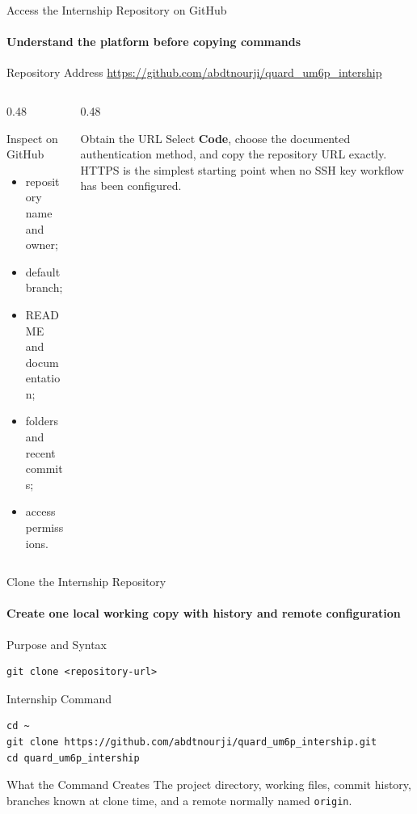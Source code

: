 \begin{frame}{Access the Internship Repository on GitHub}
\framesubtitle{Understand the platform before copying commands}
\footnotesize
\begin{block}{Repository Address}
\centering
\url{https://github.com/abdtnourji/quard_um6p_intership}
\end{block}
\begin{columns}[T,onlytextwidth]
\begin{column}{0.48\textwidth}
\begin{exampleblock}{Inspect on GitHub}
\begin{itemize}\setlength{\itemsep}{0.18em}
\item repository name and owner;
\item default branch;
\item README and documentation;
\item folders and recent commits;
\item access permissions.
\end{itemize}
\end{exampleblock}
\end{column}
\begin{column}{0.48\textwidth}
\begin{block}{Obtain the URL}
Select \textbf{Code}, choose the documented authentication method, and copy the repository URL exactly. HTTPS is the simplest starting point when no SSH key workflow has been configured.
\end{block}
\end{column}
\end{columns}
\end{frame}

\begin{frame}[fragile]{Clone the Internship Repository}
\framesubtitle{Create one local working copy with history and remote configuration}
\footnotesize
\begin{block}{Purpose and Syntax}
\begin{verbatim}
git clone <repository-url>
\end{verbatim}
\end{block}
\begin{exampleblock}{Internship Command}
\begin{verbatim}
cd ~
git clone https://github.com/abdtnourji/quard_um6p_intership.git
cd quard_um6p_intership
\end{verbatim}
\end{exampleblock}
\begin{block}{What the Command Creates}
The project directory, working files, commit history, branches known at clone time, and a remote normally named \texttt{origin}.
\end{block}
\end{frame}

